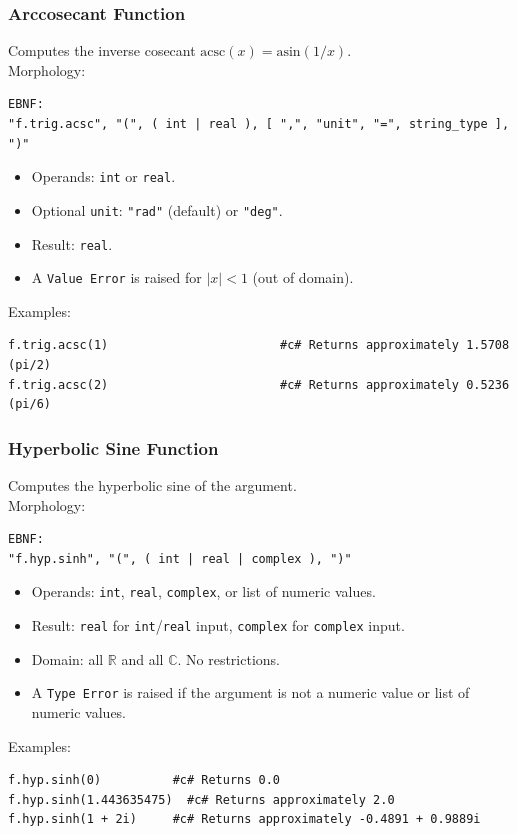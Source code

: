 \subsubsection{Arccosecant Function}
Computes the inverse cosecant $\text{acsc}(x) = \text{asin}(1/x)$. \\
Morphology:
\begin{verbatim}
EBNF:
"f.trig.acsc", "(", ( int | real ), [ ",", "unit", "=", string_type ], ")"
\end{verbatim}
\begin{itemize}
\item Operands: \texttt{int} or \texttt{real}.
\item Optional \texttt{unit}: \texttt{"rad"} (default) or \texttt{"deg"}.
\item Result: \texttt{real}.
\item A \texttt{Value Error} is raised for $|x| < 1$ (out of domain).
\end{itemize}
Examples:
\begin{verbatim}
f.trig.acsc(1)                        #c# Returns approximately 1.5708 (pi/2)
f.trig.acsc(2)                        #c# Returns approximately 0.5236 (pi/6)
\end{verbatim}

\subsubsection{Hyperbolic Sine Function}
Computes the hyperbolic sine of the argument. \\
Morphology:
\begin{verbatim}
EBNF:
"f.hyp.sinh", "(", ( int | real | complex ), ")"
\end{verbatim}
\begin{itemize}
\item Operands: \texttt{int}, \texttt{real}, \texttt{complex}, or list of numeric values.
\item Result: \texttt{real} for \texttt{int}/\texttt{real} input, \texttt{complex} for \texttt{complex} input.
\item Domain: all $\mathbb{R}$ and all $\mathbb{C}$. No restrictions.
\item A \texttt{Type Error} is raised if the argument is not a numeric value or list of numeric values.
\end{itemize}
Examples:
\begin{verbatim}
f.hyp.sinh(0)          #c# Returns 0.0
f.hyp.sinh(1.443635475)  #c# Returns approximately 2.0
f.hyp.sinh(1 + 2i)     #c# Returns approximately -0.4891 + 0.9889i
\end{verbatim}

